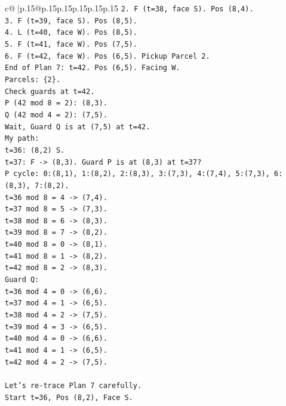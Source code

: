 \documentclass{article}
\begin{document}
{\begin{supertabular}{c@{$\;$}|p{.15\linewidth}@{}p{.15\linewidth}p{.15\linewidth}p{.15\linewidth}p{.15\linewidth}p{.15\linewidth}}
{{{\texttt{2. F (t=38, face S). Pos (8,4).} \\
\texttt{3. F (t=39, face S). Pos (8,5).} \\
\texttt{4. L (t=40, face W). Pos (8,5).} \\
\texttt{5. F (t=41, face W). Pos (7,5).} \\
\texttt{6. F (t=42, face W). Pos (6,5). Pickup Parcel 2.} \\
\texttt{End of Plan 7: t=42. Pos (6,5). Facing W.} \\
\texttt{Parcels: \{2\}.} \\
\texttt{Check guards at t=42.} \\
\texttt{P (42 mod 8 = 2): (8,3).} \\
\texttt{Q (42 mod 4 = 2): (7,5).} \\
\texttt{Wait, Guard Q is at (7,5) at t=42.} \\
\texttt{My path:} \\
\texttt{t=36: (8,2) S.} \\
\texttt{t=37: F {-}> (8,3). Guard P is at (8,3) at t=37?} \\
\texttt{P cycle: 0:(8,1), 1:(8,2), 2:(8,3), 3:(7,3), 4:(7,4), 5:(7,3), 6:(8,3), 7:(8,2).} \\
\texttt{t=36 mod 8 = 4 {-}> (7,4).} \\
\texttt{t=37 mod 8 = 5 {-}> (7,3).} \\
\texttt{t=38 mod 8 = 6 {-}> (8,3).} \\
\texttt{t=39 mod 8 = 7 {-}> (8,2).} \\
\texttt{t=40 mod 8 = 0 {-}> (8,1).} \\
\texttt{t=41 mod 8 = 1 {-}> (8,2).} \\
\texttt{t=42 mod 8 = 2 {-}> (8,3).} \\
\texttt{Guard Q:} \\
\texttt{t=36 mod 4 = 0 {-}> (6,6).} \\
\texttt{t=37 mod 4 = 1 {-}> (6,5).} \\
\texttt{t=38 mod 4 = 2 {-}> (7,5).} \\
\texttt{t=39 mod 4 = 3 {-}> (6,5).} \\
\texttt{t=40 mod 4 = 0 {-}> (6,6).} \\
\texttt{t=41 mod 4 = 1 {-}> (6,5).} \\
\texttt{t=42 mod 4 = 2 {-}> (7,5).} \\
\\ 
\texttt{Let's re{-}trace Plan 7 carefully.} \\
\texttt{Start t=36, Pos (8,2), Face S.} \\
}}}
\end{supertabular}}
\end{document}
